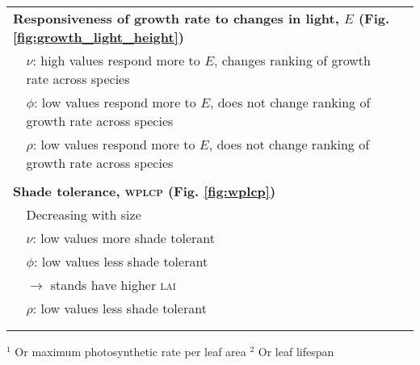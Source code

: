 \documentclass[a4paper,11pt]{article}
\begin{document}
\begin{table}[ht]
{{\begin{tabular}{p{0.1cm}p{9cm}p{6cm}}
  \\ \multicolumn{3}{l}{\bf{Responsiveness of growth rate to changes in light, $E$} (Fig. \ref{fig:growth_light_height})}\\
  & $\nu$: high values respond more to $E$, changes ranking of growth rate across species & \\
  & $\phi$: low values respond more to $E$, does not change ranking of growth rate across species & \\
  & $\rho$: low values respond more to $E$, does not change ranking of growth rate across species & \citet{Ruger-2012}\\

  \\ \multicolumn{3}{l}{\bf{Shade tolerance, \textsc{wplcp}} (Fig. \ref{fig:wplcp})}\\
  & Decreasing with size & \citet{Givnish-1988, Kneeshaw-2006, Lusk-2008}\\
  & $\nu$: low values more shade tolerant &  \citet{Messier-1999}\\
  & $\phi$: low values less shade tolerant & \citet{Messier-1999, Poorter-2006, Baltzer-2007, Lusk-2008}\\
  & \quad $\rightarrow$ stands have higher \textsc{lai} &  \citet{Reich-1992, Gower-1993, Niinemets-2010} \\
  & $\rho$: low values less shade tolerant  &  \citet{Osunkoya-1996}\\
  \\ \hline
  \\
  \end{tabular}
  }
$^1$ Or maximum photosynthetic rate per leaf area
$^2$ Or leaf lifespan
}
\label{tab:phenomena}
\end{table}

\newpage
\end{document}
